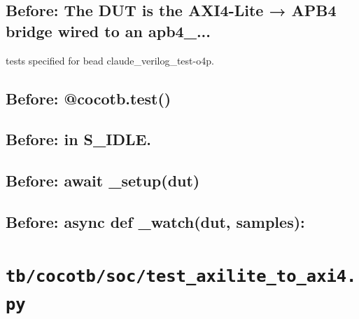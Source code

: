 \begin{record}

\subsection*{Before: The DUT is the AXI4-Lite → APB4 bridge wired to an apb4\_...}

\begin{textblock}
tests specified for bead claude_verilog_test-o4p.
\end{textblock}

\subsection*{Before: @cocotb.test()}


\subsection*{Before: in S\_IDLE.}


\subsection*{Before: await \_setup(dut)}


\subsection*{Before: async def \_watch(dut, samples):}


\end{record}

\section{\texttt{tb/cocotb/soc/test\_axilite\_to\_axi4.py}}\label{cr:suite:soc-test-axilite-to-axi4}


